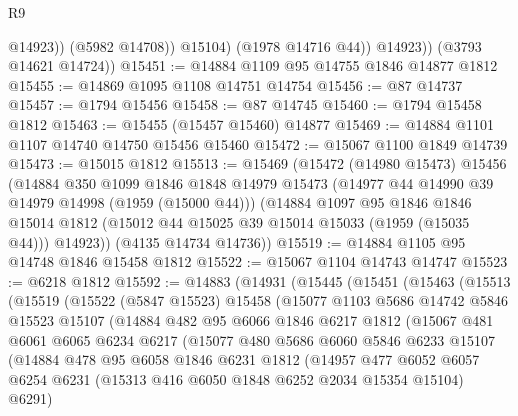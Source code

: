 \begin{lexlean}{R9}
\begin{coremodule}
                    @14923))
                (@5982 @14708))
              @15104)
            (@1978 @14716 @44))
          @14923))
      (@3793 @14621 @14724))
@15451 := @14884 @1109 @95 @14755 @1846 @14877 @1812
@15455 := @14869 @1095 @1108 @14751 @14754
@15456 := @87 @14737
@15457 := @1794 @15456
@15458 := @87 @14745
@15460 := @1794 @15458 @1812
@15463 := @15455 (@15457 @15460) @14877
@15469 := @14884 @1101 @1107 @14740 @14750 @15456 @15460
@15472 := @15067 @1100 @1849 @14739
@15473 := @15015 @1812
@15513 := @15469
    (@15472
      (@14980 @15473)
      @15456
      (@14884
        @350
        @1099
        @1846
        @1848
        @14979
        @15473
        (@14977 @44 @14990 @39 @14979 @14998 (@1959 (@15000 @44)))
        (@14884
          @1097
          @95
          @1846
          @1846
          @15014
          @1812
          (@15012 @44 @15025 @39 @15014 @15033 (@1959 (@15035 @44)))
          @14923))
      (@4135 @14734 @14736))
@15519 := @14884 @1105 @95 @14748 @1846 @15458 @1812
@15522 := @15067 @1104 @14743 @14747
@15523 := @6218 @1812
@15592 := @14883
    (@14931
      (@15445
        (@15451
          (@15463
            (@15513
              (@15519
                (@15522
                  (@5847 @15523)
                  @15458
                  (@15077
                    @1103
                    @5686
                    @14742
                    @5846
                    @15523
                    @15107
                    (@14884
                      @482
                      @95
                      @6066
                      @1846
                      @6217
                      @1812
                      (@15067
                        @481
                        @6061
                        @6065
                        @6234
                        @6217
                        (@15077
                          @480
                          @5686
                          @6060
                          @5846
                          @6233
                          @15107
                          (@14884
                            @478
                            @95
                            @6058
                            @1846
                            @6231
                            @1812
                            (@14957
                              @477
                              @6052
                              @6057
                              @6254
                              @6231
                              (@15313 @416 @6050 @1848 @6252 @2034 @15354 @15104)
                              @6291)

\end{coremodule}
\end{lexlean}
